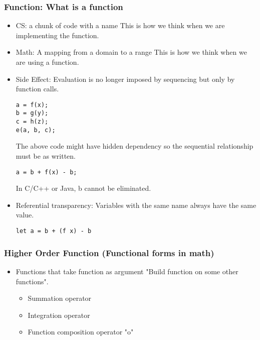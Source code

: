 \documentclass[11pt]{article}
\begin{document}
\subsubsection{Function: What is a function}
\label{sec:org5aaf39a}
\begin{itemize}
\item CS: a chunk of code with a name
This is how we think when we are implementing the function.

\item Math: A mapping from a domain to a range
This is how we think when we are using a function.

\item Side Effect: Evaluation is no longer imposed by sequencing but only by function calls.
\begin{verbatim}
a = f(x);
b = g(y);
c = h(z);
e(a, b, c);
\end{verbatim}
The above code might have hidden dependency so the sequential relationship
must be as written.

\begin{verbatim}
a = b + f(x) - b;
\end{verbatim}
In C/C++ or Java, b cannot be eliminated.

\item Referential transparency: Variables with the same name always have the same
value.
\begin{verbatim}
let a = b + (f x) - b
\end{verbatim}
\end{itemize}

\subsubsection{Higher Order Function (Functional forms in math)}
\label{sec:org38192ea}
\begin{itemize}
\item Functions that take function as argument
"Build function on some other functions".
\begin{itemize}
\item Summation operator
\item Integration operator
\item Function composition operator "o"
\end{itemize}
\end{itemize}
\end{document}
